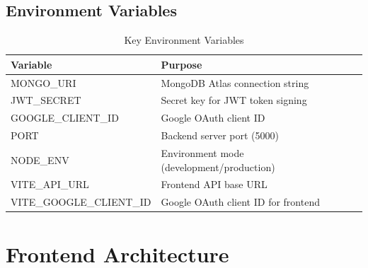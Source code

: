 \documentclass[12pt,a4paper]{article}
\begin{document}
\subsection{Environment Variables}

\begin{table}[H]
\centering
\renewcommand{\arraystretch}{1.3}
\begin{tabularx}{\textwidth}{|l|X|}
    \hline
    \textbf{Variable} & \textbf{Purpose} \\
    \hline
    MONGO\_URI & MongoDB Atlas connection string \\
    \hline
    JWT\_SECRET & Secret key for JWT token signing \\
    \hline
    GOOGLE\_CLIENT\_ID & Google OAuth client ID \\
    \hline
    PORT & Backend server port (5000) \\
    \hline
    NODE\_ENV & Environment mode (development/production) \\
    \hline
    VITE\_API\_URL & Frontend API base URL \\
    \hline
    VITE\_GOOGLE\_CLIENT\_ID & Google OAuth client ID for frontend \\
    \hline
\end{tabularx}
\caption{Key Environment Variables}
\end{table}

\section{Frontend Architecture}
\end{document}
